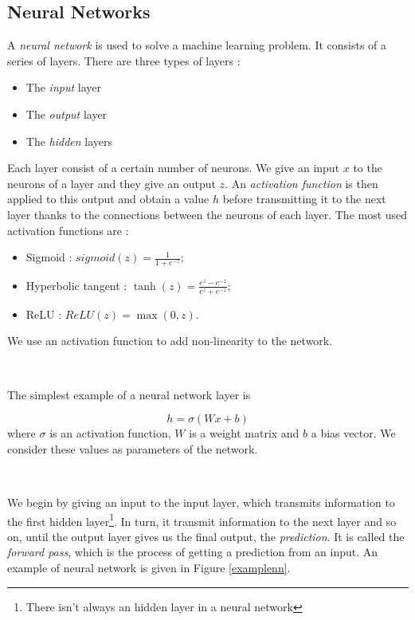 \documentclass[10pt,a4paper]{article}
\theoremstyle{definition}
\theoremstyle{plain}
\begin{document}
\subsection{Neural Networks}


\noindent A \textit{neural network} \cite{5} is used to solve a machine learning problem. It consists of a series of layers. There are three types of layers :

\begin{itemize}
\item The \textit{input} layer
\item The \textit{output} layer
\item The \textit{hidden} layers
\end{itemize}

Each layer consist of a certain number of neurons. We give an input $x$ to the neurons of a layer and they give an output $z$. An \textit{activation function} is then applied to this output and obtain a value $h$ before transmitting it to the next layer thanks to the connections between the neurons of each layer. The most used activation functions are :
\begin{itemize}
\item Sigmoid : $sigmoid(z) = \frac{1}{1 + e^{-z}}$;
\item Hyperbolic tangent : $\tanh(z) = \frac{e^z - e^{-z}}{e^z + e^{-z}}$;
\item ReLU : $ReLU(z) = \max(0,z)$.
\end{itemize}
We use an activation function to add non-linearity to the network.

~

The simplest example of a neural network layer is 

$$
h = \sigma (Wx +b)
$$
where $\sigma$ is an activation function, $W$ is a weight matrix and $b$ a bias vector. We consider these values as parameters of the network.

~

We begin by giving an input to the input layer, which transmits information to the first hidden layer\footnote{There isn't always an hidden layer in a neural network}. In turn, it transmit information to the next layer and so on, until the output layer gives us the final output, the \textit{prediction}. It is called the \textit{forward pass}, which is the process of getting a prediction from an input. An example of neural network is given in Figure \ref{examplenn}. 
\end{document}
